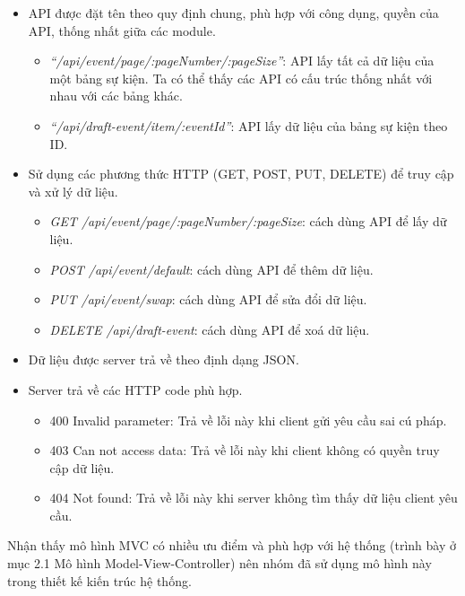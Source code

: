 \begin{itemize}
    \item API được đặt tên theo quy định chung, phù hợp với công dụng, quyền của API, thống nhất giữa các module.
    \begin{itemize}
        \item \textit{``/api/event/page/:pageNumber/:pageSize''}: API lấy tất cả dữ liệu của một bảng sự kiện. Ta có thể thấy các API có cấu trúc thống nhất với nhau với các bảng khác.
        \item \textit{``/api/draft-event/item/:eventId''}: API lấy dữ liệu của bảng sự kiện theo ID.
    \end{itemize}
    \item Sử dụng các phương thức HTTP (GET, POST, PUT, DELETE) để truy cập và xử lý dữ liệu.
    \begin{itemize}
        \item  \textit{GET /api/event/page/:pageNumber/:pageSize}: cách dùng API để lấy dữ liệu.
        \item  \textit{POST /api/event/default}: cách dùng API để thêm dữ liệu.
        \item  \textit{PUT /api/event/swap}: cách dùng API để sửa đổi dữ liệu.
        \item  \textit{DELETE /api/draft-event}: cách dùng API để xoá dữ liệu.
    \end{itemize}
    \item Dữ liệu được server trả về theo định dạng JSON.
    \item Server trả về các HTTP code phù hợp.
    \begin{itemize}
        \item  400 Invalid parameter: Trả về lỗi này khi client gửi yêu cầu sai cú pháp.
        \item  403 Can not access data: Trả về lỗi này khi client không có quyền truy cập dữ liệu.
        \item  404 Not found: Trả về lỗi này khi server không tìm thấy dữ liệu client yêu cầu.
    \end{itemize}
\end{itemize}

Nhận thấy mô hình MVC có nhiều ưu điểm và phù hợp với hệ thống (trình bày ở mục 2.1 Mô hình Model-View-Controller) nên nhóm đã sử dụng mô hình này trong thiết kế kiến trúc hệ thống.\\

